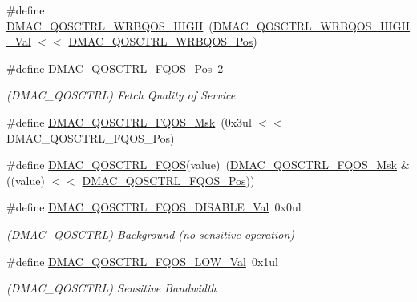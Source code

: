 \begin{DoxyCompactItemize}
\#define \mbox{\hyperlink{group___s_a_m_d21___d_m_a_c_ga64bc66293351a268eaf86a1d51521feb}{D\+M\+A\+C\+\_\+\+Q\+O\+S\+C\+T\+R\+L\+\_\+\+W\+R\+B\+Q\+O\+S\+\_\+\+H\+I\+GH}}~(\mbox{\hyperlink{group___s_a_m_d21___d_m_a_c_ga9a599be2515138ae52e7a3f5dea6e1db}{D\+M\+A\+C\+\_\+\+Q\+O\+S\+C\+T\+R\+L\+\_\+\+W\+R\+B\+Q\+O\+S\+\_\+\+H\+I\+G\+H\+\_\+\+Val}}  $<$$<$ \mbox{\hyperlink{group___s_a_m_d21___d_m_a_c_ga6336dfe829f1e5bffeae36d4dcd9343e}{D\+M\+A\+C\+\_\+\+Q\+O\+S\+C\+T\+R\+L\+\_\+\+W\+R\+B\+Q\+O\+S\+\_\+\+Pos}})
\item 
\#define \mbox{\hyperlink{group___s_a_m_d21___d_m_a_c_ga2c15ab7a648b705f35bb1d4e57139823}{D\+M\+A\+C\+\_\+\+Q\+O\+S\+C\+T\+R\+L\+\_\+\+F\+Q\+O\+S\+\_\+\+Pos}}~2
\begin{DoxyCompactList}\small\item\em (D\+M\+A\+C\+\_\+\+Q\+O\+S\+C\+T\+RL) Fetch Quality of Service \end{DoxyCompactList}\item 
\#define \mbox{\hyperlink{group___s_a_m_d21___d_m_a_c_gae3b29f347cc96e13d48704208658b41f}{D\+M\+A\+C\+\_\+\+Q\+O\+S\+C\+T\+R\+L\+\_\+\+F\+Q\+O\+S\+\_\+\+Msk}}~(0x3ul $<$$<$ D\+M\+A\+C\+\_\+\+Q\+O\+S\+C\+T\+R\+L\+\_\+\+F\+Q\+O\+S\+\_\+\+Pos)
\item 
\#define \mbox{\hyperlink{group___s_a_m_d21___d_m_a_c_ga93d1d2f52c6cc4a915d5b3a597c47929}{D\+M\+A\+C\+\_\+\+Q\+O\+S\+C\+T\+R\+L\+\_\+\+F\+Q\+OS}}(value)~(\mbox{\hyperlink{group___s_a_m_d21___d_m_a_c_gae3b29f347cc96e13d48704208658b41f}{D\+M\+A\+C\+\_\+\+Q\+O\+S\+C\+T\+R\+L\+\_\+\+F\+Q\+O\+S\+\_\+\+Msk}} \& ((value) $<$$<$ \mbox{\hyperlink{group___s_a_m_d21___d_m_a_c_ga2c15ab7a648b705f35bb1d4e57139823}{D\+M\+A\+C\+\_\+\+Q\+O\+S\+C\+T\+R\+L\+\_\+\+F\+Q\+O\+S\+\_\+\+Pos}}))
\item 
\#define \mbox{\hyperlink{group___s_a_m_d21___d_m_a_c_ga735664d8d87ef7ddaeaf7edff69445e8}{D\+M\+A\+C\+\_\+\+Q\+O\+S\+C\+T\+R\+L\+\_\+\+F\+Q\+O\+S\+\_\+\+D\+I\+S\+A\+B\+L\+E\+\_\+\+Val}}~0x0ul
\begin{DoxyCompactList}\small\item\em (D\+M\+A\+C\+\_\+\+Q\+O\+S\+C\+T\+RL) Background (no sensitive operation) \end{DoxyCompactList}\item 
\#define \mbox{\hyperlink{group___s_a_m_d21___d_m_a_c_gad0980237ae159a8be8e86b55ed957f65}{D\+M\+A\+C\+\_\+\+Q\+O\+S\+C\+T\+R\+L\+\_\+\+F\+Q\+O\+S\+\_\+\+L\+O\+W\+\_\+\+Val}}~0x1ul
\begin{DoxyCompactList}\small\item\em (D\+M\+A\+C\+\_\+\+Q\+O\+S\+C\+T\+RL) Sensitive Bandwidth \end{DoxyCompactList}\item 
$$
\end{DoxyCompactItemize}
